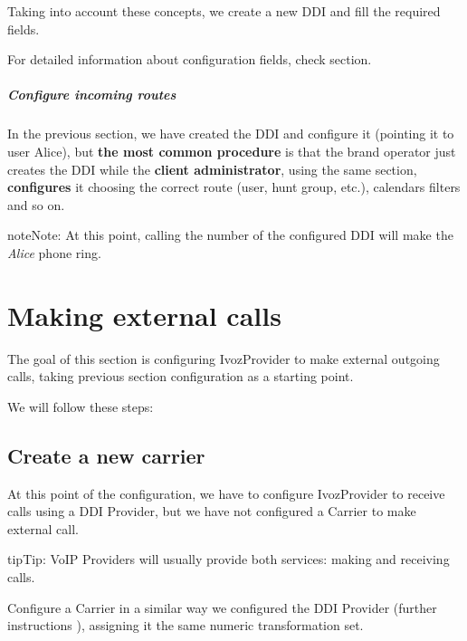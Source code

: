 \documentclass[letterpaper,10pt,english]{sphinxmanual}
\begin{document}
Taking into account these concepts, we create a new DDI and fill the required
fields.

For detailed information about configuration fields, check {\hyperref[administration_portal/client/vpbx/ddis:pbx\string-ddis]{}} section.
\paragraph{Configure incoming routes}

In the previous section, we have created the DDI and configure it (pointing it to user Alice),
but \textbf{the most common procedure} is that the brand operator just creates the DDI while the
\textbf{client administrator}, using the same section, \textbf{configures} it choosing
the correct route (user, hunt group, etc.), calendars filters and so on.

\begin{notice}{note}{Note:}
At this point, calling the number of the configured DDI will make the
\emph{Alice} phone ring.
\end{notice}


\chapter{Making external calls}
\label{getting_started/external_outgoing_calls/index:making-external-calls}\label{getting_started/external_outgoing_calls/index::doc}
The goal of this section is configuring IvozProvider to make external outgoing
calls, taking previous section configuration as a starting point.

We will follow these steps:


\section{Create a new carrier}
\label{getting_started/external_outgoing_calls/create_carrier:create-a-new-carrier}\label{getting_started/external_outgoing_calls/create_carrier::doc}
At this point of the configuration, we have to configure IvozProvider to receive
calls using a DDI Provider, but we have not configured a Carrier to make external call.

\begin{notice}{tip}{Tip:}
VoIP Providers will usually provide both services: making and receiving calls.
\end{notice}

Configure a Carrier in a similar way we configured the DDI Provider (further instructions {\hyperref[administration_portal/brand/providers/carriers:carriers]{}}),
assigning it the same numeric transformation set.
\end{document}
